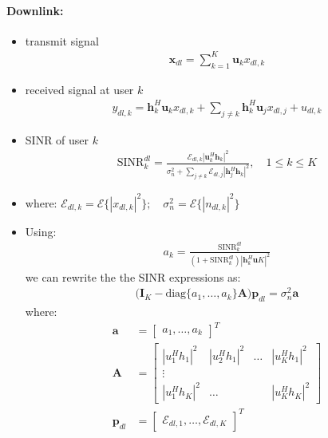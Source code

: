 \documentclass[a4paper, 10pt]{article}
\begin{document}
\paragraph{Downlink:}
\begin{itemize}
	\item transmit signal
	\begin{align*}
		\mathbf{x}_{dl} = \sum\limits_{k = 1}^{K}\mathbf{u}_kx_{dl,k}
	\end{align*}
	\item received signal at user $k$
	\begin{align*}
		y_{dl,k} = \mathbf{h}_k^H\mathbf{u}_kx_{dl,k} + \sum\limits_{j \neq k}\mathbf{h}_k^H\mathbf{u}_jx_{dl,j} + u_{dl,k}
	\end{align*}
	\item SINR of user $k$
	\begin{align*}
		\text{SINR}_k^{dl} = \frac{\mathcal{E}_{dl,k}|\mathbf{u}_k^H\mathbf{h}_k|^2}{\sigma_n^2 + \sum\limits_{j \neq k}\mathcal{E}_{dl,j}|\mathbf{h}_j^H\mathbf{h}_k|^2},\quad 1\leq k \leq K
	\end{align*}
	\item where: $\mathcal{E}_{dl,k} = \mathcal{E}\bigl\{|x_{dl,k}|^2 \bigr\}; \quad \sigma_n^2 = \mathcal{E}\bigl\{|n_{dl,k}|^2\bigr\} $
	\item Using: 
	\begin{align*}
		a_k = \frac{\text{SINR}_k^{dl}}{(1 + \text{SINR}_k^{dl})|\mathbf{h}_k^H\mathbf{u}K|^2}
	\end{align*}
	we can rewrite the the SINR expressions as:
	\begin{align*}
		\boxed{\bigl(\mathbf{I}_K - \text{diag}\{a_1, \ldots, a_k\}\mathbf{A}\bigr)\mathbf{p}_{dl} = \sigma_n^2\mathbf{a}}
	\end{align*}
	where:
	\begin{align*}
		\mathbf{a} &= \begin{bmatrix} a_1,\ldots,a_k\end{bmatrix}^T \\
		\mathbf{A} &= 
		\begin{bmatrix}
			|u_1^Hh_1|^2 & |u_2^Hh_1|^2 & \ldots & |u_K^Hh_1|^2	\\
			\vdots \\
			|u_1^Hh_K|^2 & \ldots & & |u_K^Hh_K|^2		
		\end{bmatrix} \\
		\mathbf{p}_{dl} &= 
		\begin{bmatrix}
			\mathcal{E}_{dl,1},\ldots, \mathcal{E}_{dl,K}	
		\end{bmatrix}^T

\end{align*}
\end{itemize}
\end{document}
